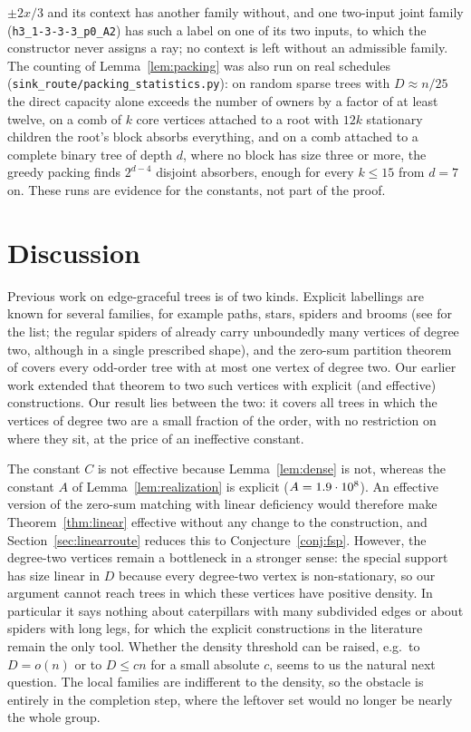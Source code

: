 \documentclass[11pt,a4paper]{article}
\theoremstyle{plain}
\theoremstyle{definition}
\theoremstyle{remark}
\newcommand{\file}[1]{\texttt{#1}}
\begin{document}
$\pm 2x/3$ and its context has another family without, and one two-input
joint family (\texttt{h3\_1-3-3-3\_p0\_A2}) has such a label on one of its
two inputs, to which the constructor never assigns a ray; no context is left
without an admissible family.  The counting of Lemma~\ref{lem:packing} was also
run on real schedules (\file{sink\_route/packing\_statistics.py}): on random
sparse trees with $D\approx n/25$ the direct capacity alone exceeds the number
of owners by a factor of at least twelve, on a comb of $k$ core vertices
attached to a root with $12k$ stationary children the root's block absorbs
everything, and on a comb attached to a complete binary tree of depth $d$,
where no block has size three or more, the greedy packing finds $2^{d-4}$
disjoint absorbers, enough for every $k\le 15$ from $d=7$ on.  These runs are
evidence for the constants, not part of the proof.

\section{Discussion}\label{sec:discussion}

Previous work on edge-graceful trees is of two kinds.  Explicit labellings
are known for several families, for example paths, stars, spiders and brooms
(see \cite{GallianDS6} for the list; the regular spiders of
\cite{CabanissLowMitchem} already carry unboundedly many vertices of degree
two, although in a single prescribed shape), and the zero-sum partition theorem of
\cite{KaplanLevRoditty2009} covers every odd-order tree with at most one
vertex of degree two.  Our earlier work \cite{Meng2026two} extended that
theorem to two such vertices with explicit (and effective) constructions.
Our result lies between the two: it covers all trees
in which the vertices of degree two are a small fraction of the order, with
no restriction on where they sit, at the price of an ineffective constant.

The constant $C$ is not effective because Lemma~\ref{lem:dense} is not,
whereas the constant $A$ of Lemma~\ref{lem:realization} is explicit
($A=1.9\cdot 10^{8}$).  An effective version of the zero-sum matching with
linear deficiency would therefore make Theorem~\ref{thm:linear} effective
without any change to the construction, and Section~\ref{sec:linearroute}
reduces this to Conjecture~\ref{conj:fsp}.  However, the degree-two vertices
remain a bottleneck in a stronger sense: the special support has size linear
in $D$ because every degree-two vertex is non-stationary, so our argument
cannot reach trees in which these vertices have positive density.  In
particular it says nothing about caterpillars with many subdivided edges or
about spiders with long legs, for which the explicit constructions in the
literature remain the only tool.  Whether the density threshold can be
raised, e.g.\ to $D=o(n)$ or to $D\le cn$ for a small absolute $c$, seems to us
the natural next question.  The local families are indifferent to the density,
so the obstacle is entirely in the completion step, where the leftover set
would no longer be nearly the whole group.
\end{document}
